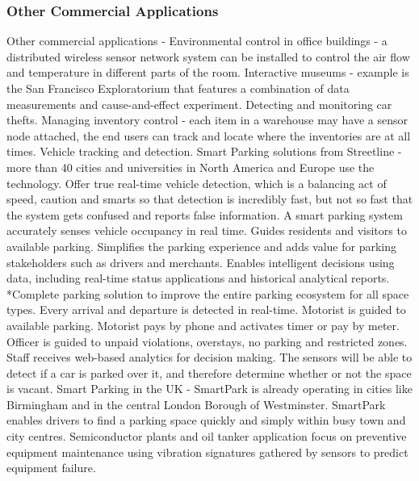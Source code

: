 \subsubsection{Other Commercial Applications}
Other commercial applications - Environmental control in office buildings - a distributed wireless sensor network system can be installed to control the air flow and temperature in different parts of the room. Interactive museums - example is the San Francisco Exploratorium that features a combination of data measurements and cause-and-effect experiment. Detecting and monitoring car thefts. Managing inventory control - each item in a warehouse may have a sensor node attached, the end users can track and locate where the inventories are at all times. Vehicle tracking and detection.
Smart Parking solutions from Streetline - more than 40 cities and universities in North America and Europe use the technology. Offer true real-time vehicle detection, which is a balancing act of speed, caution and smarts so that detection is incredibly fast, but not so fast that the system gets confused and reports false information. A smart parking system accurately senses vehicle occupancy in real time. Guides residents and visitors to available parking. Simplifies the parking experience and adds value for parking stakeholders such as drivers and merchants. Enables intelligent decisions using data, including real-time status applications and historical analytical reports. *Complete parking solution to improve the entire parking ecosystem for all space types. Every arrival and departure is detected in real-time. Motorist is guided to available parking. Motorist pays by phone and activates timer or pay by meter. Officer is guided to unpaid violations, overstays, no parking and restricted zones. Staff receives web-based analytics for decision making. The sensors will be able to detect if a car is parked over it, and therefore determine whether or not the space is vacant. 
Smart Parking in the UK - SmartPark is already operating in cities like Birmingham and in the central London Borough of Westminster.  SmartPark enables drivers to find a parking space quickly and simply within busy town and city centres. 
Semiconductor plants and oil tanker \cite{industrialsensor} application focus on preventive equipment maintenance using vibration signatures gathered by sensors to predict equipment failure.

